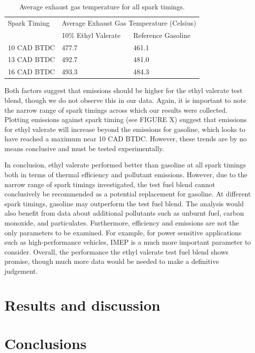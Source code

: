 \documentclass[11pt]{article}
\begin{document}
\begin{table}[H]
	\begin{center}
	\begin{tabular}{@{}lll@{}}
		\toprule
		Spark Timing & \multicolumn{2}{c}{Average Exhaust Gas Temperature (Celsius)} \\
		\cmidrule{2-3} & 10\% Ethyl Valerate & Reference Gasoline \\
		\midrule
		10 CAD BTDC & 477.7 & 461.1 \\
		13 CAD BTDC & 492.7 & 481.0 \\
		16 CAD BTDC & 493.3 & 484.3 \\
		\bottomrule
	\end{tabular}
	\caption{Average exhaust gas temperature for all spark timings.}
	\label{q7-t1}
	\end{center}
\end{table}
Both factors suggest that  emissions should be higher for the ethyl valerate test blend, though we do not observe this in our data. Again, it is important to note the narrow range of spark timings across which our results were collected. Plotting  emissions against spark timing (see FIGURE X) suggest that  emissions for ethyl valerate will increase beyond the  emissions for gasoline, which looks to have reached a maximum near 10 CAD BTDC. However, these trends are by no means conclusive and must be tested experimentally.

In conclusion, ethyl valerate performed better than gasoline at all spark timings both in terms of thermal efficiency and pollutant emissions. However, due to the narrow range of spark timings investigated, the test fuel blend cannot conclusively be recommended as a potential replacement for gasoline. At different spark timings, gasoline may outperform the test fuel blend. The analysis would also benefit from data about additional pollutants such as unburnt fuel, carbon monoxide, and particulates. Furthermore, efficiency and emissions are not the only parameters to be examined. For example, for power sensitive applications such as high-performance vehicles, IMEP is a much more important parameter to consider. Overall, the performance the ethyl valerate test fuel blend shows promise, though much more data would be needed to make a definitive judgement. 
\section*{Results and discussion}
\section*{Conclusions}
\begin{thebibliography}{00}

\end{thebibliography}
\end{document}

